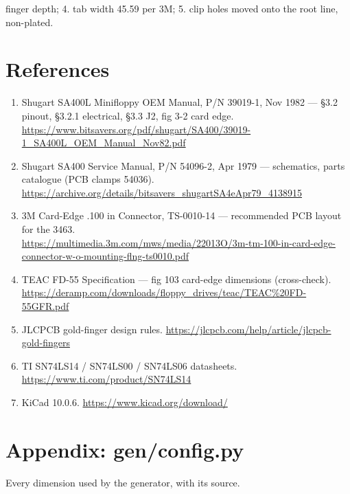 \documentclass[11pt,a4paper]{article}
\begin{document}
finger depth; 4. tab width 45.59 per 3M; 5. clip holes moved onto the root line, non-plated.


\section{References}
\begin{enumerate}[leftmargin=8mm]
\item Shugart SA400L Minifloppy OEM Manual, P/N 39019-1, Nov 1982 --- \S3.2 pinout, \S3.2.1 electrical,
\S3.3 J2, fig 3-2 card edge.\\ \url{https://www.bitsavers.org/pdf/shugart/SA400/39019-1_SA400L_OEM_Manual_Nov82.pdf}
\item Shugart SA400 Service Manual, P/N 54096-2, Apr 1979 --- schematics, parts catalogue (PCB clamps 54036).\\
\url{https://archive.org/details/bitsavers_shugartSA4eApr79_4138915}
\item 3M Card-Edge .100 in Connector, TS-0010-14 --- recommended PCB layout for the 3463.\\
\url{https://multimedia.3m.com/mws/media/22013O/3m-tm-100-in-card-edge-connector-w-o-mounting-flng-ts0010.pdf}
\item TEAC FD-55 Specification --- fig 103 card-edge dimensions (cross-check).\\
\url{https://deramp.com/downloads/floppy_drives/teac/TEAC\%20FD-55GFR.pdf}
\item JLCPCB gold-finger design rules. \url{https://jlcpcb.com/help/article/jlcpcb-gold-fingers}
\item TI SN74LS14 / SN74LS00 / SN74LS06 datasheets. \url{https://www.ti.com/product/SN74LS14}
\item KiCad 10.0.6. \url{https://www.kicad.org/download/}
\end{enumerate}

\clearpage
\appendix
\section{Appendix: gen/config.py}
Every dimension used by the generator, with its source.

\end{document}
